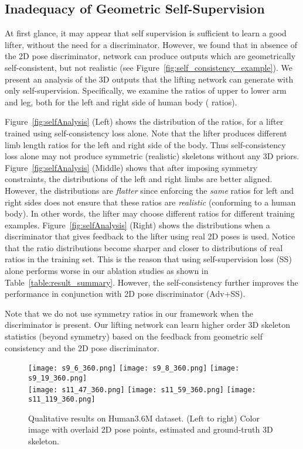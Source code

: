 \documentclass[10pt,twocolumn,letterpaper]{article}
\begin{document}
\subsection{Inadequacy of Geometric Self-Supervision}
\label{subsect:degeneracy_self_consistency}
At first glance, it may appear that self supervision is sufficient to learn a good lifter, without the need for a discriminator. However, we found that in absence of the 2D pose discriminator, network can produce outputs which are geometrically self-consistent, but not realistic (see Figure~\ref{fig:self_consistency_example}). We present an analysis of the 3D outputs that the lifting network can generate with only self-supervision. Specifically, we examine the ratios of upper to lower arm and leg, both for the left and right side of human body ( ratios).

Figure~\ref{fig:selfAnalysis} (Left) shows the distribution of the  ratios, for a lifter trained using self-consistency loss alone. Note that the lifter produces different limb length ratios for the left and right side of the body. Thus self-consistency loss alone may not produce symmetric (realistic) skeletons without any 3D priors. 
Figure~\ref{fig:selfAnalysis} (Middle) shows that after imposing symmetry constraints, the distributions of the left and right limbs are better aligned. However, the distributions are \textit{flatter} since enforcing the \textit{same} ratios for left and right sides does not ensure that these ratios are \textit{realistic} (conforming to a human body). In other words, the lifter may choose different ratios for different training examples. Figure~\ref{fig:selfAnalysis} (Right) shows the distributions when a discriminator that gives feedback to the lifter using real 2D poses is used. Notice that the ratio distributions become sharper and closer to distributions of real ratios in the training set.  This is the reason that using self-supervision loss (SS) alone performs worse in our ablation studies as shown in Table~\ref{table:result_summary}. However, the self-consistency further improves the performance in conjunction with 2D pose discriminator (Adv+SS).

Note that we do not use symmetry ratios in our framework when the discriminator is present. Our lifting network can learn higher order 3D skeleton statistics (beyond symmetry) based on the feedback from geometric self consistency and the 2D pose discriminator.

\begin{figure}[h!]\centering
\texttt{[image: s9\_6\_360.png]}
	\texttt{[image: s9\_8\_360.png]}
	\texttt{[image: s9\_19\_360.png]}\\
\texttt{[image: s11\_47\_360.png]}
	\texttt{[image: s11\_59\_360.png]}
	\texttt{[image: s11\_119\_360.png]}
	\caption{Qualitative results on Human3.6M dataset. (Left to right) Color image with overlaid 2D pose points, estimated and ground-truth 3D skeleton.}
	\label{fig:h36good}
\end{figure}
\end{document}
